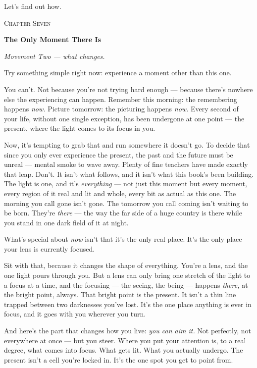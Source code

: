 \documentclass[11pt,openany]{book}
\begin{document}
Let’s find out how.


\clearpage
\vspace*{0.6in}
{\centering\scshape\large Chapter Seven\par}
\vspace{0.8em}
{\centering\bfseries\fontsize{20}{24}\selectfont The Only Moment There Is\par}
\vspace{1.6em}

\textit{Movement Two — what changes.}

Try something simple right now: experience a moment other than this one.

You can’t. Not because you’re not trying hard enough — because there’s nowhere else the experiencing can happen. Remember this morning: the remembering happens \textit{now.} Picture tomorrow: the picturing happens \textit{now.} Every second of your life, without one single exception, has been undergone at one point — the present, where the light comes to its focus in you.

Now, it’s tempting to grab that and run somewhere it doesn’t go. To decide that since you only ever experience the present, the past and the future must be unreal — mental smoke to wave away. Plenty of fine teachers have made exactly that leap. Don’t. It isn’t what follows, and it isn’t what this book’s been building. The light is one, and it’s \textit{everything} — not just this moment but every moment, every region of it real and lit and whole, every bit as actual as this one. The morning you call gone isn’t gone. The tomorrow you call coming isn’t waiting to be born. They’re \textit{there} — the way the far side of a huge country is there while you stand in one dark field of it at night.

What’s special about \textit{now} isn’t that it’s the only real place. It’s the only place your lens is currently focused.

Sit with that, because it changes the shape of everything. You’re a lens, and the one light pours through you. But a lens can only bring one stretch of the light to a focus at a time, and the focusing — the seeing, the being — happens \textit{there,} at the bright point, always. That bright point is the present. It isn’t a thin line trapped between two darknesses you’ve lost. It’s the one place anything is ever in focus, and it goes with you wherever you turn.

And here’s the part that changes how you live: \textit{you can aim it.} Not perfectly, not everywhere at once — but you steer. Where you put your attention is, to a real degree, what comes into focus. What gets lit. What you actually undergo. The present isn’t a cell you’re locked in. It’s the one spot you get to point from.
\end{document}
